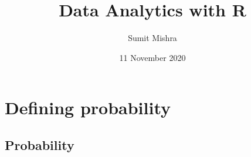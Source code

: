 \documentclass[notes,11pt, aspectratio=169]{beamer}
\title[DAR]{Data Analytics with R}  %
\author{Sumit Mishra} %
\institute[IFMR] %
{
Institute for Financial Management and Research, Sri City \\ %
\medskip
\medskip
\textbf{Probability} %
}
\date{11 November 2020} %
\begin{document}

{
\addtocounter{framenumber}{-1} 
{\removepagenumbers 
\begin{frame}


\titlepage

\end{frame}
}
}


\section{Defining probability}


\subsection{Probability}

\end{document}
